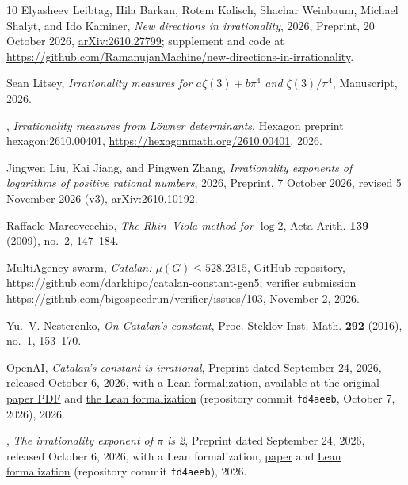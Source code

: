 \documentclass[11pt]{amsart}
\theoremstyle{definition}
\theoremstyle{remark}
\numberwithin{equation}{section}
\begin{document}
\begin{thebibliography}{10}
Elyasheev Leibtag, Hila Barkan, Rotem Kalisch, Shachar Weinbaum, Michael
  Shalyt, and Ido Kaminer, \emph{New directions in irrationality}, 2026,
  Preprint, 20 October 2026,
  \href{https://arxiv.org/abs/2610.27799}{arXiv:2610.27799}; supplement and
  code at
  \url{https://github.com/RamanujanMachine/new-directions-in-irrationality}.

Sean Litsey, \emph{Irrationality measures for {$a\zeta(3)+b\pi^4$} and
  {$\zeta(3)/\pi^4$}}, Manuscript, 2026.

\bysame, \emph{Irrationality measures from {L\"owner} determinants}, Hexagon
  preprint hexagon:2610.00401, \url{https://hexagonmath.org/2610.00401}, 2026.

Jingwen Liu, Kai Jiang, and Pingwen Zhang, \emph{Irrationality exponents of
  logarithms of positive rational numbers}, 2026, Preprint, 7 October 2026,
  revised 5 November 2026 (v3),
  \href{https://arxiv.org/abs/2610.10192}{arXiv:2610.10192}.

Raffaele Marcovecchio, \emph{The {R}hin--{V}iola method for {$\log 2$}}, Acta
  Arith. \textbf{139} (2009), no.~2, 147--184.

{MultiAgency swarm}, \emph{Catalan: {$\mu(G)\le528.2315$}}, GitHub repository,
  \url{https://github.com/darkhipo/catalan-constant-gen5}; verifier submission
  \url{https://github.com/bigospeedrun/verifier/issues/103}, November 2, 2026.

Yu.~V. Nesterenko, \emph{On {C}atalan's constant}, Proc. Steklov Inst. Math.
  \textbf{292} (2016), no.~1, 153--170.

{OpenAI}, \emph{Catalan's constant is irrational}, Preprint dated September 24,
  2026, released October 6, 2026, with a Lean formalization, available at
  \href{https://github.com/openai/math/blob/fd4aeeb2ee4fc729c18d98444fed42fd0529eeeb/preprints/Catalans-constant-is-irrational-September-24-2026/paper.pdf}{the
  original paper PDF} and
  \href{https://github.com/openai/math/tree/fd4aeeb2ee4fc729c18d98444fed42fd0529eeeb/lean/OAI/NumberTheory/Catalan}{the
  Lean formalization} (repository commit \texttt{fd4aeeb}, October 7, 2026),
  2026.

\bysame, \emph{The irrationality exponent of {$\pi$} is 2}, Preprint dated
  September 24, 2026, released October 6, 2026, with a Lean formalization,
  \href{https://github.com/openai/math/tree/fd4aeeb2ee4fc729c18d98444fed42fd0529eeeb/preprints/The-irrationality-exponent-of-pi-is-2-September-24-2026}{paper}
  and
  \href{https://github.com/openai/math/tree/fd4aeeb2ee4fc729c18d98444fed42fd0529eeeb/lean/OAI/NumberTheory/PiExponent}{Lean
  formalization} (repository commit \texttt{fd4aeeb}), 2026.


\end{thebibliography}
\end{document}
